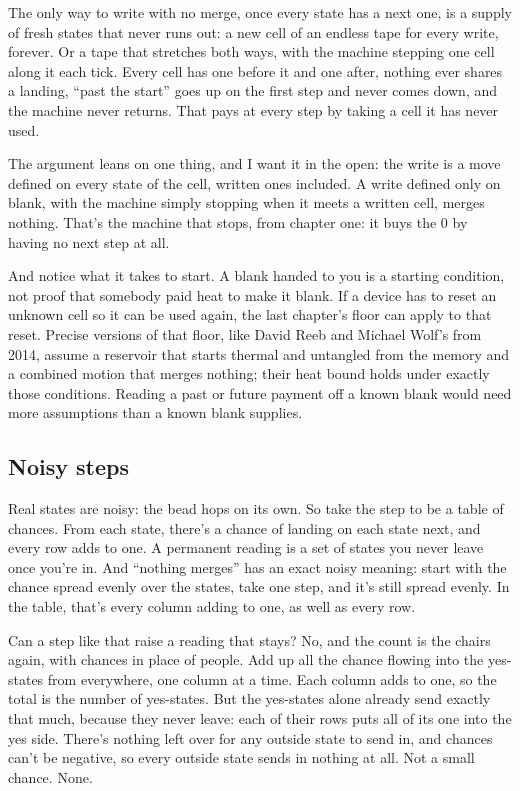 \documentclass[11pt,twoside]{article}
\theoremstyle{thielethm}
\theoremstyle{thieledef}
\theoremstyle{thieledef}
\theoremstyle{thieledef}
\theoremstyle{thielethm}
\theoremstyle{thieleobs}
\theoremstyle{thielethm}
\begin{document}
The only way to write with no merge, once every state has a next one, is a supply of fresh states that never runs out: a new cell of an endless tape for every write, forever. Or a tape that stretches both ways, with the machine stepping one cell along it each tick. Every cell has one before it and one after, nothing ever shares a landing, ``past the start'' goes up on the first step and never comes down, and the machine never returns. That pays at every step by taking a cell it has never used.

The argument leans on one thing, and I want it in the open: the write is a move defined on every state of the cell, written ones included. A write defined only on blank, with the machine simply stopping when it meets a written cell, merges nothing. That's the machine that stops, from chapter one: it buys the 0 by having no next step at all.

And notice what it takes to start. A blank handed to you is a starting condition, not proof that somebody paid heat to make it blank. If a device has to reset an unknown cell so it can be used again, the last chapter's floor can apply to that reset. Precise versions of that floor, like David Reeb and Michael Wolf's from 2014, assume a reservoir that starts thermal and untangled from the memory and a combined motion that merges nothing; their heat bound holds under exactly those conditions. Reading a past or future payment off a known blank would need more assumptions than a known blank supplies.

\subsection{Noisy steps}

Real states are noisy: the bead hops on its own. So take the step to be a table of chances. From each state, there's a chance of landing on each state next, and every row adds to one. A permanent reading is a set of states you never leave once you're in. And ``nothing merges'' has an exact noisy meaning: start with the chance spread evenly over the states, take one step, and it's still spread evenly. In the table, that's every column adding to one, as well as every row.

Can a step like that raise a reading that stays? No, and the count is the chairs again, with chances in place of people. Add up all the chance flowing into the yes-states from everywhere, one column at a time. Each column adds to one, so the total is the number of yes-states. But the yes-states alone already send exactly that much, because they never leave: each of their rows puts all of its one into the yes side. There's nothing left over for any outside state to send in, and chances can't be negative, so every outside state sends in nothing at all. Not a small chance. None.
\end{document}
